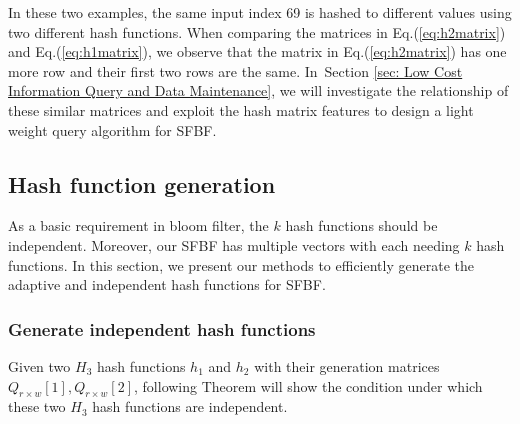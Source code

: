 \documentclass[10pt,journal,compsoc]{IEEEtran}
\begin{document}
In these two examples, the same input index 69 is hashed to different values using two different hash functions. When comparing the matrices in Eq.(\ref{eq:h2matrix}) and Eq.(\ref{eq:h1matrix}), we observe that the matrix in Eq.(\ref{eq:h2matrix}) has one more row and their first two rows are the same. In~Section \ref{sec: Low Cost Information Query and Data Maintenance}, we will investigate the relationship of these
similar matrices and exploit the hash matrix features to design a light weight query algorithm for SFBF.

\subsection{Hash function generation}
As a basic requirement  in bloom filter, the $k$ hash functions should be independent. Moreover,  our SFBF has multiple vectors with each needing $k$ hash functions. In this section, we  present our methods to efficiently generate the adaptive and independent hash functions for SFBF.
\subsubsection{Generate independent hash functions}
Given two $H_3$ hash functions $h_1$ and $h_2$ with their generation matrices ${Q_{r \times w}[1]},{Q_{r \times w}[2]}$, following Theorem will show the condition under which these two $H_3$ hash functions are independent.
\end{document}
